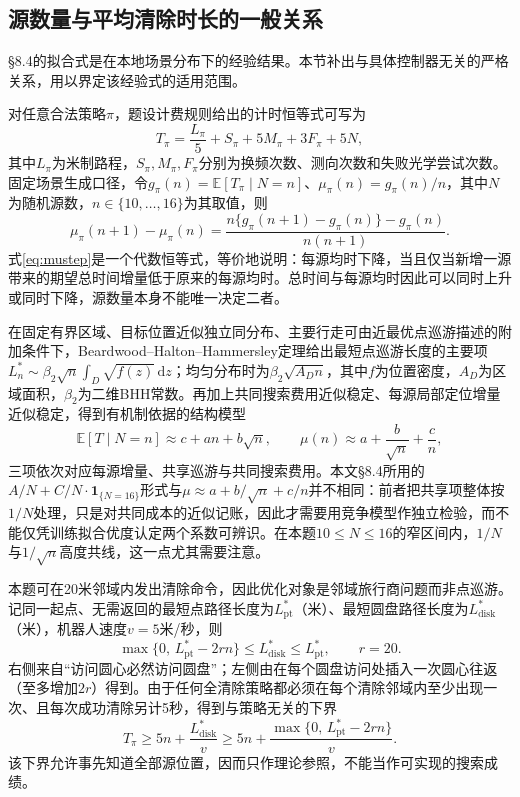 \documentclass[UTF8,a4paper,zihao=-4,fontset=fandol]{ctexart}
\begin{document}


\subsection{源数量与平均清除时长的一般关系}
\S8.4的拟合式是在本地场景分布下的经验结果。本节补出与具体控制器无关的严格关系，用以界定该经验式的适用范围。

对任意合法策略$\pi$，题设计费规则给出的计时恒等式可写为
\begin{equation}T_\pi=\frac{L_\pi}{5}+S_\pi+5M_\pi+3F_\pi+5N,\end{equation}
其中$L_\pi$为米制路程，$S_\pi,M_\pi,F_\pi$分别为换频次数、测向次数和失败光学尝试次数。固定场景生成口径，令$g_\pi(n)=\mathbb E[T_\pi\mid N=n]$、$\mu_\pi(n)=g_\pi(n)/n$，其中$N$为随机源数，$n\in\{10,\ldots,16\}$为其取值，则
\begin{equation}\label{eq:mustep}
 \mu_\pi(n+1)-\mu_\pi(n)
 =\frac{n\{g_\pi(n+1)-g_\pi(n)\}-g_\pi(n)}{n(n+1)} .
\end{equation}
式\eqref{eq:mustep}是一个代数恒等式，等价地说明：每源均时下降，当且仅当新增一源带来的期望总时间增量低于原来的每源均时。总时间与每源均时因此可以同时上升或同时下降，源数量本身不能唯一决定二者。

在固定有界区域、目标位置近似独立同分布、主要行走可由近最优点巡游描述的附加条件下，Beardwood--Halton--Hammersley定理\cite{bhh}给出最短点巡游长度的主要项$L_n^*\sim\beta_2\sqrt n\int_D\sqrt{f(z)}\,\mathrm dz$；均匀分布时为$\beta_2\sqrt{A_Dn}$，其中$f$为位置密度，$A_D$为区域面积，$\beta_2$为二维BHH常数。再加上共同搜索费用近似稳定、每源局部定位增量近似稳定，得到有机制依据的结构模型
\begin{equation}\mathbb E[T\mid N=n]\approx c+an+b\sqrt n,\qquad
 \mu(n)\approx a+\frac b{\sqrt n}+\frac c n,\end{equation}
三项依次对应每源增量、共享巡游与共同搜索费用。本文\S8.4所用的$A/N+C/N\cdot\mathbf1_{\{N=16\}}$形式与$\mu\approx a+b/\sqrt n+c/n$并不相同：前者把共享项整体按$1/N$处理，只是对共同成本的近似记账，因此才需要用竞争模型作独立检验，而不能仅凭训练拟合优度认定两个系数可辨识。在本题$10\le N\le16$的窄区间内，$1/N$与$1/\sqrt n$高度共线，这一点尤其需要注意。

本题可在20米邻域内发出清除命令，因此优化对象是邻域旅行商问题而非点巡游\cite{dumitrescu}。记同一起点、无需返回的最短点路径长度为$L^*_{\mathrm{pt}}$（米）、最短圆盘路径长度为$L^*_{\mathrm{disk}}$（米），机器人速度$v=5$米/秒，则
\begin{equation}\max\{0,\,L^*_{\mathrm{pt}}-2rn\}\le L^*_{\mathrm{disk}}\le L^*_{\mathrm{pt}},\qquad r=20.\end{equation}
右侧来自“访问圆心必然访问圆盘”；左侧由在每个圆盘访问处插入一次圆心往返（至多增加$2r$）得到。由于任何全清除策略都必须在每个清除邻域内至少出现一次、且每次成功清除另计5秒，得到与策略无关的下界
\begin{equation}T_\pi\ge5n+\frac{L^*_{\mathrm{disk}}}{v}\ge5n+\frac{\max\{0,\,L^*_{\mathrm{pt}}-2rn\}}{v}.\end{equation}
该下界允许事先知道全部源位置，因而只作理论参照，不能当作可实现的搜索成绩。
\end{document}
